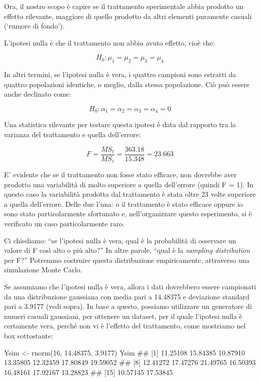 \documentclass[a4paper,12pt,oneside]{book}
\newenvironment{Shaded}{\begin{snugshade}}{\end{snugshade}}
\newcommand{\DecValTok}[1]{#1}
\newcommand{\FloatTok}[1]{#1}
\newcommand{\DocumentationTok}[1]{#1}
\newcommand{\OtherTok}[1]{#1}
\newcommand{\FunctionTok}[1]{#1}
\newcommand{\NormalTok}[1]{#1}
\begin{document}
Ora, il nostro scopo è capire se il trattamento sperimentale abbia prodotto un effetto rilevante, maggiore di quello prodotto da altri elementi puramente casuali (`rumore di fondo').

L'ipotesi nulla è che il trattamento non abbia avuto effetto, cioè che:

\[H_0: \mu_1 = \mu_2 = \mu_3 = \mu_4\]

In altri termini, se l'ipotesi nulla è vera, i quattro campioni sono estratti da quattro popolazioni identiche, o meglio, dalla stessa popolazione. Ciò può essere anche declinato come:

\[H_0: \alpha_1 = \alpha_2 = \alpha_3 = \alpha_4 = 0\]

Una statistica rilevante per testare questa ipotesi è data dal rapporto tra la varianza del trattamento e quella dell'errore:

\[F = \frac{MS_t}{MS_e} = \frac{363.18}{15.348} = 23.663\]

E' evidente che se il trattamento non fosse stato efficace, non dovrebbe aver prodotto una variabilità di molto superiore a quella dell'errore (quindi F = 1). In questo caso la variabilità prodotta dal trattamento è stata oltre 23 volte superiore a quella dell'errore. Delle due l'una: o il trattamento è stato efficace oppure io sono stato particolarmente sfortunato e, nell'organizzare questo esperimento, si è verificato un caso particolarmente raro.

Ci chiediamo: ``se l'ipotesi nulla è vera, qual è la probabilità di osservare un valore di F così alto o più alto?'' In altre parole, ``qual è la \emph{sampling distribution} per F?'' Potremmo costruire questa distribuzione empiricamente, attraverso una simulazione Monte Carlo.

Se assumiamo che l'ipotesi nulla è vera, allora i dati dovrebbero essere campionati da una distribuzione gaussiana con media pari a 14.48375 e deviazione standard pari a 3.9177 (vedi sopra). In base a questo, possiamo utilizzare un generatore di numeri casuali gaussiani, per ottenere un dataset, per il quale l'ipotesi nulla è certamente vera, perché non vi è l'effetto del trattamento, come mostriamo nel box sottostante:

\begin{Shaded}
\begin{Highlighting}[]
\NormalTok{Ysim }\OtherTok{\textless{}{-}} \FunctionTok{rnorm}\NormalTok{(}\DecValTok{16}\NormalTok{, }\FloatTok{14.48375}\NormalTok{, }\FloatTok{3.9177}\NormalTok{)}
\NormalTok{Ysim}
\DocumentationTok{\#\#  [1] 11.25108 15.84385 10.87910 13.35805 12.32459 17.80849 19.59052}
\DocumentationTok{\#\#  [8] 12.41272 17.47276 21.49765 16.50393 16.48161 17.92167 13.28823}
\DocumentationTok{\#\# [15] 10.57145 17.53845}
\end{Highlighting}
\end{Shaded}
\end{document}
